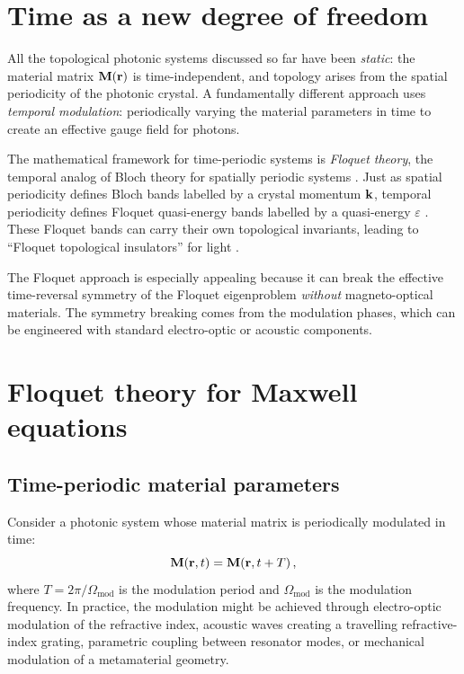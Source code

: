 
\section{Time as a new degree of freedom}
\label{sec:ch13-time}

All the topological photonic systems discussed so far have been
\emph{static}: the material matrix $\mathbf{M}(\mathbf{r})$ is time-independent,
and topology arises from the spatial periodicity of the photonic
crystal.  A fundamentally different approach uses \emph{temporal
modulation}: periodically varying the material parameters in time to
create an effective gauge field for photons.

The mathematical framework for time-periodic systems is \emph{Floquet
theory}, the temporal analog of Bloch theory for spatially periodic
systems \cite{ozawa2018topological}.  Just as spatial periodicity defines Bloch bands labelled by
a crystal momentum $\mathbf{k}$, temporal periodicity defines Floquet
quasi-energy bands labelled by a quasi-energy $\varepsilon$
\cite{zhong2024topological}.  These
Floquet bands can carry their own topological invariants, leading to
``Floquet topological insulators'' for light
\cite{zhang2021proposal}.

The Floquet approach is especially appealing because it can break the
effective time-reversal symmetry of the Floquet eigenproblem
\emph{without} magneto-optical materials.  The symmetry breaking comes
from the modulation phases, which can be engineered with standard
electro-optic or acoustic components.

\section{Floquet theory for Maxwell equations}
\label{sec:ch13-floquet-theory}

\subsection{Time-periodic material parameters}
\label{sec:ch13-time-periodic}

Consider a photonic system whose material matrix is periodically
modulated in time:
\begin{equation}\label{eq:ch13-time-periodic}
  \mathbf{M}(\mathbf{r},t) = \mathbf{M}(\mathbf{r},t+T)\,,
\end{equation}
where $T=2\pi/\Omega_{\mathrm{mod}}$ is the modulation period and
$\Omega_{\mathrm{mod}}$ is the modulation frequency.  In practice, the
modulation might be achieved through electro-optic modulation of the
refractive index, acoustic waves creating a travelling refractive-index
grating, parametric coupling between resonator modes, or mechanical
modulation of a metamaterial geometry.

